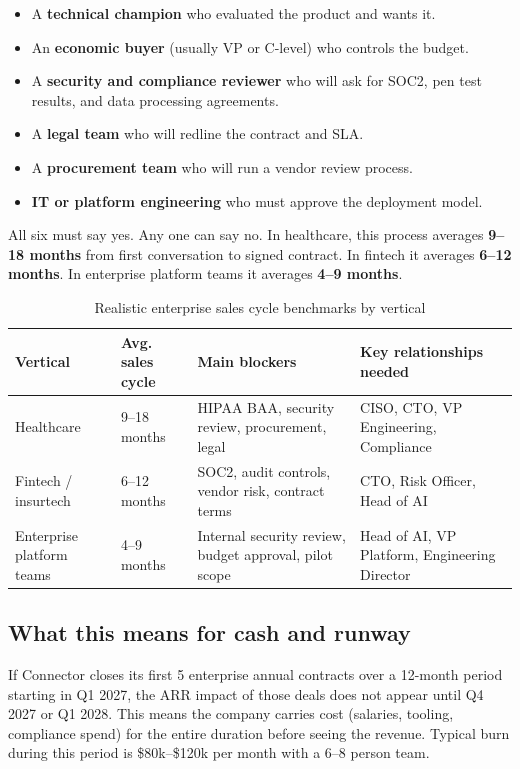\begin{itemize}[leftmargin=1.5em,itemsep=3pt]
  \item A \textbf{technical champion} who evaluated the product and wants it.
  \item An \textbf{economic buyer} (usually VP or C-level) who controls the budget.
  \item A \textbf{security and compliance reviewer} who will ask for SOC2, pen
        test results, and data processing agreements.
  \item A \textbf{legal team} who will redline the contract and SLA.
  \item A \textbf{procurement team} who will run a vendor review process.
  \item \textbf{IT or platform engineering} who must approve the deployment model.
\end{itemize}

All six must say yes. Any one can say no. In healthcare, this process averages
\textbf{9--18 months} from first conversation to signed contract. In fintech it
averages \textbf{6--12 months}. In enterprise platform teams it averages
\textbf{4--9 months}.

\begin{table}[H]
\centering
\renewcommand{\arraystretch}{1.45}
\begin{tabularx}{\textwidth}{@{}lXXX@{}}
\toprule
\textbf{Vertical} & \textbf{Avg. sales cycle} & \textbf{Main blockers} & \textbf{Key relationships needed} \\
\midrule
Healthcare & 9--18 months & HIPAA BAA, security review, procurement, legal & CISO, CTO, VP Engineering, Compliance \\
Fintech / insurtech & 6--12 months & SOC2, audit controls, vendor risk, contract terms & CTO, Risk Officer, Head of AI \\
Enterprise platform teams & 4--9 months & Internal security review, budget approval, pilot scope & Head of AI, VP Platform, Engineering Director \\
\bottomrule
\end{tabularx}
\caption{Realistic enterprise sales cycle benchmarks by vertical}
\end{table}

\subsection{What this means for cash and runway}

If Connector closes its first 5 enterprise annual contracts over a 12-month
period starting in Q1 2027, the ARR impact of those deals does not appear until
Q4 2027 or Q1 2028. This means the company carries cost (salaries, tooling,
compliance spend) for the entire duration before seeing the revenue. Typical
burn during this period is \$80k--\$120k per month with a 6--8 person team.

